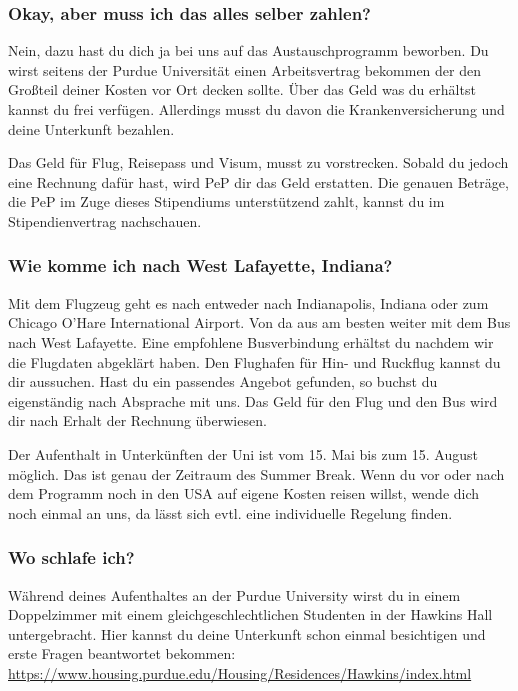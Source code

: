\documentclass[
  paper=a4,
  fontsize=12pt,
  DIV=16,
  headheight=52pt,
  footheight=45pt,
  headinclude,
  parskip=full,
]{scrartcl}
\begin{document}
\subsubsection*{Okay, aber muss ich das alles selber zahlen?}
Nein, dazu hast du dich ja bei uns auf das Austauschprogramm beworben.
Du wirst seitens der Purdue Universität einen Arbeitsvertrag bekommen der den Großteil deiner Kosten vor Ort decken sollte.
Über das Geld was du erhältst kannst du frei verfügen.
Allerdings musst du davon die Krankenversicherung und deine Unterkunft bezahlen.

Das Geld für Flug, Reisepass und Visum, musst zu vorstrecken.
Sobald du jedoch eine Rechnung dafür hast, wird PeP dir das Geld erstatten.
Die genauen Beträge, die PeP im Zuge dieses Stipendiums unterstützend zahlt, kannst du im Stipendienvertrag nachschauen.

\subsubsection*{Wie komme ich nach West Lafayette, Indiana?}
Mit dem Flugzeug geht es nach entweder nach Indianapolis, Indiana oder zum
Chicago O'Hare International Airport.
Von da aus am besten weiter mit dem Bus nach West Lafayette.
Eine empfohlene Busverbindung erhältst du nachdem wir die Flugdaten abgeklärt
haben.
Den Flughafen für Hin- und Ruckflug kannst du dir aussuchen.
Hast du ein passendes Angebot gefunden, so buchst du eigenständig nach Absprache mit uns.
Das Geld für den Flug und den Bus wird dir nach Erhalt der Rechnung überwiesen.

Der Aufenthalt in Unterkünften der Uni ist vom 15. Mai bis zum 15. August
möglich. Das ist genau der Zeitraum des Summer Break. Wenn du vor oder nach dem
Programm noch in den USA auf eigene Kosten reisen willst, wende dich noch einmal an uns, da lässt sich evtl. eine individuelle Regelung finden.


\subsubsection*{Wo schlafe ich?}
Während deines Aufenthaltes an der Purdue University wirst du in einem Doppelzimmer mit einem gleichgeschlechtlichen Studenten in der Hawkins Hall untergebracht.
Hier kannst du deine Unterkunft schon einmal besichtigen und erste Fragen beantwortet bekommen: \url{https://www.housing.purdue.edu/Housing/Residences/Hawkins/index.html}
\end{document}
